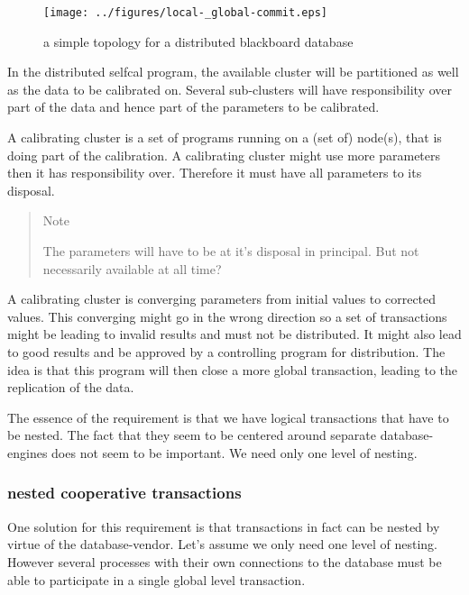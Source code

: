 \documentclass[]{lofar}
\begin{document}
      \begin{figure}
        \texttt{[image: ../figures/local-\_global-commit.eps]}
        \hypertarget{fig:localGlobalCommit}{}
        \caption{a simple topology for a distributed blackboard database\label{fig:localGlobalCommit}}
      \end{figure}

      In the distributed selfcal program, the available cluster will
      be partitioned as well as the data to be calibrated on. Several
      sub-clusters will have responsibility over part of the data and
      hence part of the parameters to be calibrated.

      A calibrating cluster is a set of programs running on a (set of)
      node(s), that is doing part of the calibration.  A calibrating
      cluster might use more parameters then it has responsibility
      over. Therefore it must have all parameters to its
      disposal.

      \begin{verse}{Note}

        The parameters will have to be at it's disposal in
        principal. But not necessarily available at all time?

      \end{verse}

      A calibrating cluster is converging parameters from initial
      values to corrected values. This converging might go in the
      wrong direction so a set of transactions might be leading to
      invalid results and must not be distributed. It might also lead
      to good results and be approved by a controlling program for
      distribution. The idea is that this program will then close a
      more global transaction, leading to the replication of the data.

      The essence of the requirement is that we have logical
      transactions that have to be nested. The fact that they seem to
      be centered around separate database-engines does not seem to be
      important. We need only one level of nesting.

      \subsubsection{nested cooperative transactions}
      \label{subsubsec:nested-cooperative-transaction}\hypertarget{subsubsec:nested-cooperative-transaction}{}

        One solution for this requirement is that transactions in fact
        can be nested by virtue of the database-vendor. Let's assume
        we only need one level of nesting. However several processes
        with their own connections to the database must be able to
        participate in a single global level transaction.
\end{document}

